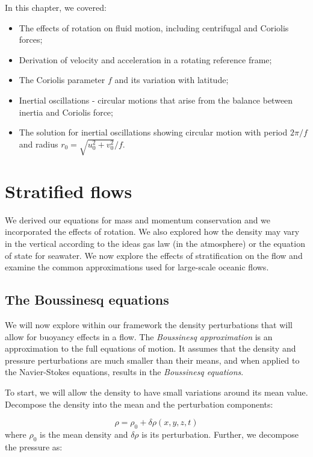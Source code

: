\documentclass[12pt]{article}
\numberwithin{equation}{section}
\numberwithin{figure}{section}
\numberwithin{table}{section}
\begin{document}
In this chapter, we covered:

\begin{itemize}
  \item The effects of rotation on fluid motion, including centrifugal and Coriolis
  forces;
  \item Derivation of velocity and acceleration in a rotating reference frame;
  \item The Coriolis parameter $f$ and its variation with latitude;
  \item Inertial oscillations - circular motions that arise from the balance between
  inertia and Coriolis force;
  \item The solution for inertial oscillations showing circular motion with period
  $2\pi/f$ and radius $r_0 = \sqrt{u_0^2 + v_0^2}/f$.
\end{itemize}

\newpage
\section{Stratified flows}

We derived our equations for mass and momentum conservation and we incorporated
the effects of rotation.
We also explored how the density may vary in the vertical according to the
ideas gas law (in the atmosphere) or the equation of state for seawater.
We now explore the effects of stratification on the flow and examine the
common approximations used for large-scale oceanic flows.

\subsection{The Boussinesq equations}

We will now explore within our framework the density perturbations that will
allow for buoyancy effects in a flow.
The \textit{Boussinesq approximation} is an
approximation to the full equations of motion.
It assumes that the density and pressure perturbations are much smaller than
their means, and when applied to the Navier-Stokes equations, results in the
\textit{Boussinesq equations}.

To start, we will allow the density to have small variations around its mean
value.
Decompose the density into the mean and the perturbation components:

\begin{equation}
  \rho = \rho_0 + \delta \rho(x, y, z, t)
  \label{eq:boussinesq_density}
\end{equation}
where $\rho_0$ is the mean density and $\delta \rho$ is its perturbation.
Further, we decompose the pressure as:
\end{document}
